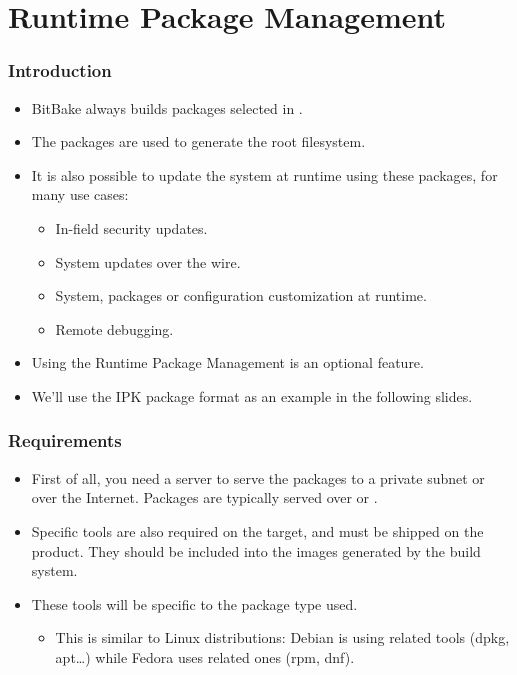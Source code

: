 \section{Runtime Package Management}

\begin{frame}
  \frametitle{Introduction}
  \begin{itemize}
    \item BitBake always builds packages selected in
      .
    \item The packages are used to generate the root filesystem.
    \item It is also possible to update the system at runtime using these
      packages, for many use cases:
      \begin{itemize}
        \item In-field security updates.
        \item System updates over the wire.
        \item System, packages or configuration customization at
          runtime.
        \item Remote debugging.
      \end{itemize}
    \item Using the Runtime Package Management is an optional feature.
    \item We'll use the IPK package format as an example in the
      following slides.
  \end{itemize}
\end{frame}

\begin{frame}
  \frametitle{Requirements}
  \begin{itemize}
    \item First of all, you need a server to serve the packages to a
      private subnet or over the Internet. Packages are typically
      served over  or .
    \item Specific tools are also required on the target, and must be
      shipped on the product. They should be included into the images
      generated by the build system.
    \item These tools will be specific to the package type used.
      \begin{itemize}
        \item This is similar to Linux distributions: Debian is using
           related tools (dpkg, apt\dots) while Fedora uses
           related ones (rpm, dnf).
      \end{itemize}
  \end{itemize}
\end{frame}

